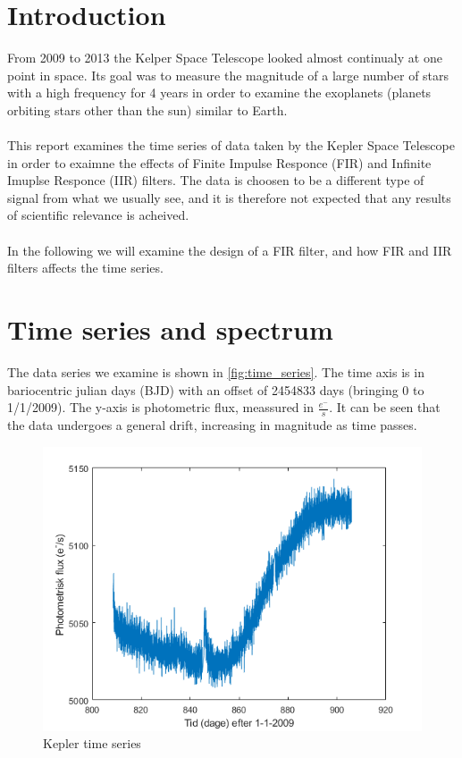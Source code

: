 \section{Introduction}

From 2009 to 2013 the Kelper Space Telescope looked almost continualy at one point in space. Its goal was to measure the magnitude of a large number of stars with a high frequency for 4 years in order to examine the exoplanets (planets orbiting stars other than the sun) similar to Earth. \\
\\
This report examines the time series of data taken by the Kepler Space Telescope in order to exaimne the effects of Finite Impulse Responce (FIR) and Infinite Imuplse Responce (IIR) filters. The data is choosen to be a different type of signal from what we usually see, and it is therefore not expected that any results of scientific relevance is acheived.\\
\\
In the following we will examine the design of a FIR filter, and how FIR and IIR filters affects the time series. 


\section{Time series and spectrum}

The data series we examine is shown in \autoref{fig:time_series}. The time axis is in bariocentric julian days (BJD) with an offset of 2454833 days (bringing 0 to 1/1/2009). The y-axis is photometric flux, meassured in $\frac{e^-}{s}$. It can be seen that the data undergoes a general drift, increasing in magnitude as time passes.

\begin{figure}[h]
    \centering
    \includegraphics[width = \textwidth]{kep_timeseries.png}
    \caption{Kepler time series}
    \label{fig:time_series}
\end{figure}

